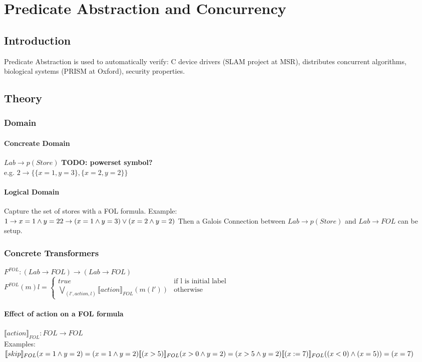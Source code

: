 \chapter{Predicate Abstraction and Concurrency}
\section{Introduction}
Predicate Abstraction is used to automatically verify: C device drivers (SLAM project at MSR), distributes concurrent algorithms, biological systems (PRISM at Oxford), security properties.
\section{Theory}
\subsection{Domain}
\subsubsection{Concreate Domain}
$Lab \to p(Store)$ \textbf{TODO: powerset symbol?}\\
e.g. $2 \to \{\{x=1,y=3\},\{x=2,y=2\}\}$
\subsubsection{Logical Domain}
Capture the set of stores with a FOL formula. Example:\\
$1 \to x=1 \wedge y=2\\
2 \to (x=1\wedge y=3) \vee (x=2\wedge y=2)$
Then a Galois Connection between $Lab \to p(Store)$ and $Lab \to FOL$ can be setup.
\subsection{Concrete Transformers}
$F^{FOL}:(Lab \to FOL) \to (Lab \to FOL)$\\
$F^{FOL}(m)l = \begin{cases} true &\mbox{if l is initial label}\\ 
\bigvee_{(l',action,l)}\llbracket action \rrbracket_{FOL}(m(l')) & \mbox{otherwise}\end{cases}$
\subsubsection{Effect of action on a FOL formula}
$\llbracket action \rrbracket_{FOL}: FOL \to FOL$\\Examples: \\
$\llbracket skip \rrbracket_{FOL}(x=1 \wedge y=2) = (x=1 \wedge y=2)\\ \llbracket (x > 5)\rrbracket_{FOL}(x>0 \wedge y=2)=(x>5 \wedge y=2)\\ \llbracket (x:=7) \rrbracket_{FOL}((x<0) \wedge (x=5)) = (x=7)$
